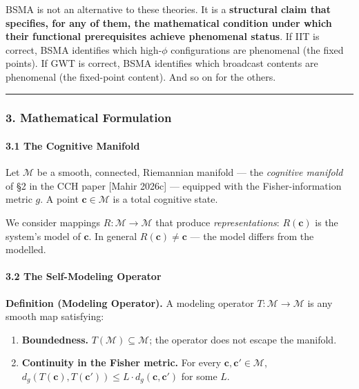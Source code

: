\documentclass[
  11pt,
  a4paper,
]{article}
\providecommand{\tightlist}{%
  \setlength{\itemsep}{0pt}\setlength{\parskip}{0pt}}
\begin{document}
BSMA is not an alternative to these theories. It is a \textbf{structural
claim that specifies, for any of them, the mathematical condition under
which their functional prerequisites achieve phenomenal status}. If IIT
is correct, BSMA identifies which high-\(\phi\) configurations are
phenomenal (the fixed points). If GWT is correct, BSMA identifies which
broadcast contents are phenomenal (the fixed-point content). And so on
for the others.

\begin{center}\rule{0.5\linewidth}{0.5pt}\end{center}

\subsubsection{3. Mathematical
Formulation}\label{mathematical-formulation}

\paragraph{3.1 The Cognitive Manifold}\label{the-cognitive-manifold}

Let \(\mathcal{M}\) be a smooth, connected, Riemannian manifold --- the
\emph{cognitive manifold} of §2 in the CCH paper {[}Mahir 2026c{]} ---
equipped with the Fisher-information metric \(g\). A point
\(\mathbf{c} \in \mathcal{M}\) is a total cognitive state.

We consider mappings \(R: \mathcal{M} \to \mathcal{M}\) that produce
\emph{representations}: \(R(\mathbf{c})\) is the system's model of
\(\mathbf{c}\). In general \(R(\mathbf{c}) \neq \mathbf{c}\) --- the
model differs from the modelled.

\paragraph{3.2 The Self-Modeling
Operator}\label{the-self-modeling-operator}

\textbf{Definition (Modeling Operator).} A modeling operator
\(T: \mathcal{M} \to \mathcal{M}\) is any smooth map satisfying:

\begin{enumerate}
\def\labelenumi{\arabic{enumi}.}
\tightlist
\item
  \textbf{Boundedness.} \(T(\mathcal{M}) \subseteq \mathcal{M}\); the
  operator does not escape the manifold.
\item
  \textbf{Continuity in the Fisher metric.} For every
  \(\mathbf{c}, \mathbf{c}' \in \mathcal{M}\),
  \(d_g(T(\mathbf{c}), T(\mathbf{c}')) \leq L \cdot d_g(\mathbf{c}, \mathbf{c}')\)
  for some \(L\).
\end{enumerate}
\end{document}
